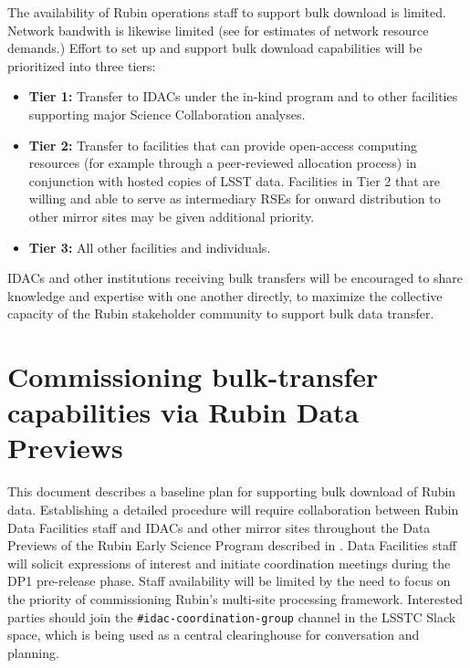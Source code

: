 The availability of Rubin operations staff to support bulk download is limited. Network bandwith is likewise limited (see  for estimates of network resource demands.) Effort to set up and support bulk download capabilities will be prioritized into three tiers:
\begin{itemize}
\item \textbf{Tier 1:} Transfer to IDACs under the in-kind program and to other facilities supporting major Science Collaboration analyses.
\item \textbf{Tier 2:} Transfer to facilities that can provide open-access computing resources (for example through a peer-reviewed allocation process) in conjunction with hosted copies of LSST data. Facilities in Tier 2 that are willing and able to serve as intermediary RSEs for onward distribution to other mirror sites may be given additional priority.
\item \textbf{Tier 3:} All other facilities and individuals.
\end{itemize}

IDACs and other institutions receiving bulk transfers will be encouraged to share knowledge and expertise with one another directly, to maximize the collective capacity of the Rubin stakeholder community to support bulk data transfer.

\section{Commissioning bulk-transfer capabilities via Rubin Data Previews}

This document describes a baseline plan for supporting bulk download of Rubin data. Establishing a detailed procedure will require collaboration between Rubin Data Facilities staff and IDACs and other mirror sites throughout the Data Previews of the Rubin Early Science Program described in . Data Facilities staff will solicit expressions of interest and initiate coordination meetings during the DP1 pre-release phase. Staff availability will be limited by the need to focus on the priority of commissioning Rubin's multi-site processing framework. Interested parties should join the \texttt{\#idac-coordination-group} channel in the LSSTC Slack space, which is being used as a central clearinghouse for conversation and planning.
